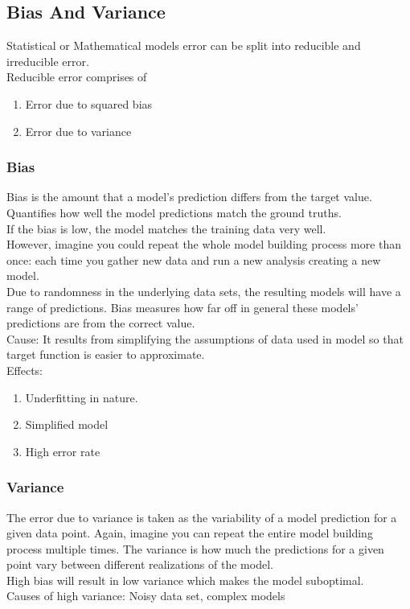 \documentclass[12pt,letterpaper, onecolumn]{exam}
\begin{document}
 \newpage
 \subsection*{Bias And Variance}
 
 Statistical or Mathematical models error can be split into reducible and irreducible error. \\Reducible error comprises of 
 \begin{enumerate}
 \item Error due to squared bias
 \item Error due to variance
 \end{enumerate}
 
 \subsubsection*{Bias}
 Bias is the amount that a model’s prediction differs from the target value.\\
 Quantifies how well the model predictions match the ground truths.\\
 If the bias is low, the model matches the training data very well.\\
 However, imagine you could repeat the whole model building process more than once: each time you gather new data and run a new analysis creating a new model.\\ Due to randomness in the underlying data sets, the resulting models will have a range of predictions. Bias measures how far off in general these models' predictions are from the correct value.\\
 Cause: It results from simplifying the assumptions of data used in model so that target function is easier to approximate.\\
 Effects:
 \begin{enumerate}
 \item Underfitting in nature.
 \item Simplified model
 \item High error rate
 \end{enumerate}
 
 \subsubsection*{Variance}
 The error due to variance is taken as the variability of a model prediction for a given data point. Again, imagine you can repeat the entire model building process multiple times. The variance is how much the predictions for a given point vary between different realizations of the model.\\
 High bias will result in low variance which makes the model suboptimal.
 \\
 Causes of high variance: Noisy data set, complex models 
 
\end{document}
